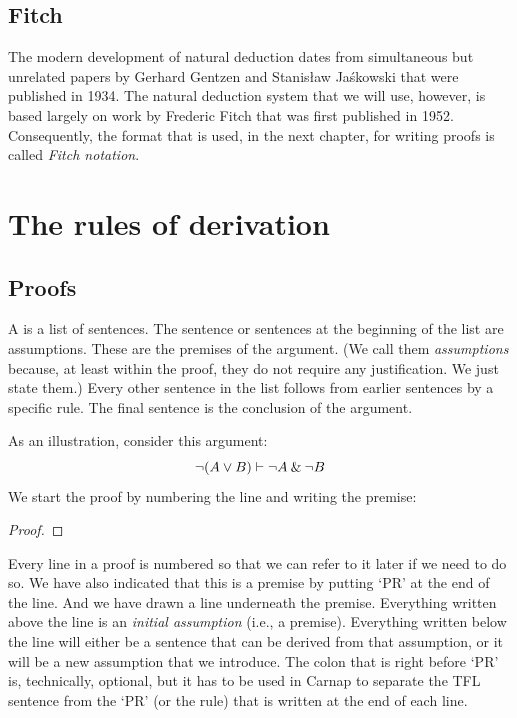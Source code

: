 \section{Fitch} 

The modern development of natural deduction dates from simultaneous but unrelated papers by Gerhard Gentzen and Stanisław Jaśkowski that were published in 1934. The natural deduction system that we will use, however, is based largely on work by Frederic Fitch that was first published in 1952. Consequently, the format that is used, in the next chapter, for writing proofs is called \textit{Fitch notation}.



\chapter{The rules of derivation}\label{s:BasicTFL}

\section{Proofs}

A  is a list of sentences. The sentence or sentences at the beginning of the list are assumptions. These are the premises of the argument. (We call them \textit{assumptions} because, at least within the proof, they do not require any justification. We just state them.) Every other sentence in the list follows from earlier sentences by a specific rule. The final sentence is the conclusion of the argument.

As an illustration, consider this argument:
	$${\neg} (A \vee B) \vdash {\neg} A \mathbin{\&} {\neg} B$$
We start the proof by numbering the line and writing the premise:
\begin{proof}
	 \pr{}
\end{proof}
Every line in a proof is numbered so that we can refer to it later if we need to do so. We have also indicated that this is a premise by putting `PR' at the end of the line. And we have drawn a line underneath the premise. Everything written above the line is an \emph{initial assumption} (i.e., a premise). Everything written below the line will either be a sentence that can be derived from that assumption, or it will be a new assumption that we introduce. The colon that is right before `PR' is, technically, optional, but it has to be used in Carnap to separate the TFL sentence from the `PR' (or the rule) that is written at the end of each line.

